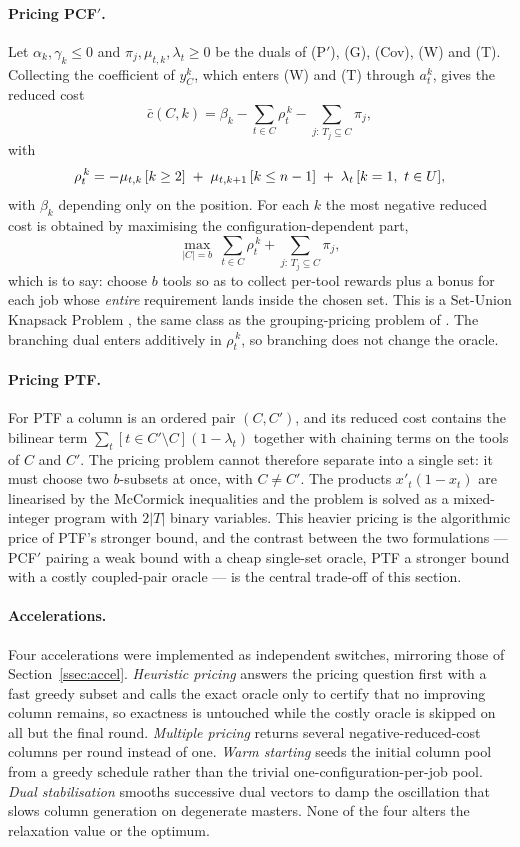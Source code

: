 \paragraph{Pricing PCF$'$.}
Let $\alpha_k,\gamma_k\le0$ and $\pi_j,\mu_{t,k},\lambda_t\ge0$ be the duals of
(P$'$), (G), (Cov), (W) and (T). Collecting the coefficient of $y_C^{k}$, which enters
(W) and (T) through $a_t^{k}$, gives the reduced cost
\[
  \bar c(C,k)=\beta_k-\sum_{t\in C}\rho_t^{\,k}-\!\!\sum_{j:\,T_j\subseteq C}\!\!\pi_j,
\]
with
\[
  \rho_t^{\,k}=-\mu_{t,k}\,[k\ge2]\;+\;\mu_{t,k+1}\,[k\le n-1]\;+\;\lambda_t\,[k=1,\ t\in U],
\]
with $\beta_k$ depending only on the position. For each $k$ the most negative reduced
cost is obtained by maximising the configuration-dependent part,
\[
  \max_{\lvert C\rvert=b}\ \sum_{t\in C}\rho_t^{\,k}
  +\!\!\sum_{j:\,T_j\subseteq C}\!\!\pi_j ,
\]
which is to say: choose $b$ tools so as to collect per-tool rewards plus a bonus for
each job whose \emph{entire} requirement lands inside the chosen set. This is a
Set-Union Knapsack Problem \citep{Goldschmidt1994}, the same class as the
grouping-pricing problem of \citet{Crama1994Column}. The branching dual enters
additively in $\rho_t^{\,k}$, so branching does not change the oracle.

\paragraph{Pricing PTF.}
For PTF a column is an ordered pair $(C,C')$, and its reduced cost contains the
bilinear term $\sum_t[t\in C'\setminus C](1-\lambda_t)$ together with chaining terms on
the tools of $C$ and $C'$. The pricing problem cannot therefore separate into a single
set: it must choose two $b$-subsets at once, with $C\ne C'$. The products
$x'_t(1-x_t)$ are linearised by the McCormick inequalities and the problem is solved as
a mixed-integer program with $2\lvert T\rvert$ binary variables. This heavier pricing
is the algorithmic price of PTF's stronger bound, and the contrast between the two
formulations --- PCF$'$ pairing a weak bound with a cheap single-set oracle, PTF a
stronger bound with a costly coupled-pair oracle --- is the central trade-off of this
section.

\paragraph{Accelerations.}
Four accelerations were implemented as independent switches, mirroring those of
Section~\ref{ssec:accel}. \emph{Heuristic pricing} answers the pricing question first
with a fast greedy subset and calls the exact oracle only to certify that no improving
column remains, so exactness is untouched while the costly oracle is skipped on all but
the final round. \emph{Multiple pricing} returns several negative-reduced-cost columns
per round instead of one. \emph{Warm starting} seeds the initial column pool from a
greedy schedule rather than the trivial one-configuration-per-job pool. \emph{Dual
stabilisation} \citep{Lubbecke2005} smooths successive dual vectors to damp the
oscillation that slows column generation on degenerate masters. None of the four
alters the relaxation value or the optimum.

